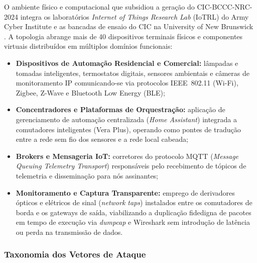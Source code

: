 O ambiente físico e computacional que subsidiou a geração do CIC-BCCC-NRC-2024 integra os laboratórios \emph{Internet of Things Research Lab} (IoTRL) do Army Cyber Institute e as bancadas de ensaio do CIC na University of New Brunswick \cite{sasi2025efficient}. A topologia abrange mais de 40 dispositivos terminais físicos e componentes virtuais distribuídos em múltiplos domínios funcionais:
\begin{itemize}
    \item \textbf{Dispositivos de Automação Residencial e Comercial:} lâmpadas e tomadas inteligentes, termostatos digitais, sensores ambientais e câmeras de monitoramento IP comunicando-se via protocolos IEEE~802.11 (Wi-Fi), Zigbee, Z-Wave e Bluetooth Low Energy (BLE);
    \item \textbf{Concentradores e Plataformas de Orquestração:} aplicação de gerenciamento de automação centralizada (\emph{Home Assistant}) integrada a comutadores inteligentes (Vera Plus), operando como pontes de tradução entre a rede sem fio dos sensores e a rede local cabeada;
    \item \textbf{Brokers e Mensageria IoT:} corretores do protocolo MQTT (\emph{Message Queuing Telemetry Transport}) responsáveis pelo recebimento de tópicos de telemetria e disseminação para nós assinantes;
    \item \textbf{Monitoramento e Captura Transparente:} emprego de derivadores ópticos e elétricos de sinal (\emph{network taps}) instalados entre os comutadores de borda e os gateways de saída, viabilizando a duplicação fidedigna de pacotes em tempo de execução via \emph{dumpcap} e Wireshark sem introdução de latência ou perda na transmissão de dados.
\end{itemize}

\subsubsection{Taxonomia dos Vetores de Ataque}

